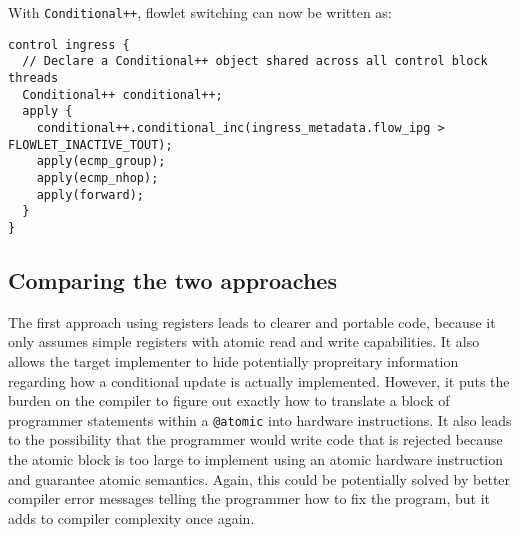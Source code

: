 With \texttt{Conditional++}, flowlet switching can now be written as:
\begin{verbatim}
control ingress {
  // Declare a Conditional++ object shared across all control block threads
  Conditional++ conditional++;
  apply {
    conditional++.conditional_inc(ingress_metadata.flow_ipg > FLOWLET_INACTIVE_TOUT);
    apply(ecmp_group);
    apply(ecmp_nhop);
    apply(forward);
  }
}
\end{verbatim}

\subsection{Comparing the two approaches}
The first approach using registers leads to clearer and portable code, because
it only assumes simple registers with atomic read and write capabilities. It
also allows the target implementer to hide potentially propreitary information
regarding how a conditional update is actually implemented. However, it puts
the burden on the compiler to figure out exactly how to translate a block of
programmer statements within a \texttt{@atomic} into hardware instructions. It
also leads to the possibility that the programmer would write code that is
rejected because the atomic block is too large to implement using an atomic
hardware instruction and guarantee atomic semantics. Again, this could be
potentially solved by better compiler error messages telling the programmer how
to fix the program, but it adds to compiler complexity once again.

